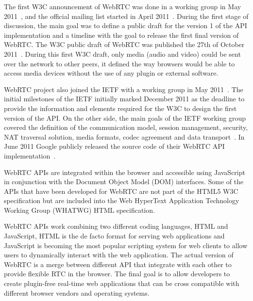 The first W3C announcement of WebRTC was done in a working group in May 2011~\cite{webrtcW3cgroup}, and the official mailing list started in April 2011~\cite{welcomeW3C}. During the first stage of discussion, the main goal was to define a public draft for the version 1 of the API implementation and a timeline with the goal to release the first final version of WebRTC. The W3C public draft of WebRTC was published the 27th of October 2011~\cite{originalW3Cdraft}. During this first W3C draft, only media (audio and video) could be sent over the network to other peers, it defined the way browsers would be able to access media devices without the use of any plugin or external software.

WebRTC project also joined the IETF with a working group in May 2011~\cite{webrtcIETFgroup}. The initial milestones of the IETF initially marked December 2011 as the deadline to provide the information and elements required for the W3C to design the first version of the API. On the other side, the main goals of the IETF working group covered the definition of the communication model, session management, security, NAT traversal solution, media formats, codec agreement and data transport~\cite{webrtcIETFcharter}. In June 2011 Google publicly released the source code of their WebRTC API implementation~\cite{haraldpublicWebRTC}. 

WebRTC APIs are integrated within the browser and accessible using JavaScript in conjunction with the Document Object Model (DOM) interfaces. Some of the APIs that have been developed for WebRTC are not part of the HTML5 W3C specification but are included into the Web HyperText Application Technology Working Group (WHATWG)  HTML specification.

WebRTC APIs work combining two different coding languages, HTML and JavaScript, HTML is the de facto format for serving web applications and JavaScript is becoming the most popular scripting system for web clients to allow users to dynamically interact with the web application. The actual version of WebRTC is a merge between different API that integrate with each other to provide flexible RTC in the browser. The final goal is to allow developers to create plugin-free real-time web applications that can be cross compatible with different browser vendors and operating systems.

%

